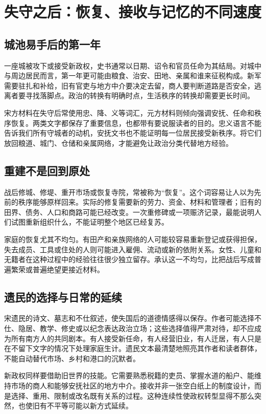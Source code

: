 \section{失守之后：恢复、接收与记忆的不同速度}

\subsection{城池易手后的第一年}

一座城被攻下或接受新政权，史书通常以日期、诏令和官员任命为其结局。对城中与周边居民而言，第一年更可能由粮食、治安、田地、亲属和谁来征税构成。新军需要驻扎和补给，旧有官吏与地方中介要决定去留，商人要判断道路是否安全，逃离者要寻找落脚点。政治的转换有明确时点，生活秩序的转换却需要更长时间。

宋方材料在失守后常使用忠、降、义等词汇，元方材料则倾向强调安抚、任命和秩序恢复。两类文字都保存了重要信息，也都带有要说服读者的目的。忠义语言不能告诉我们所有守城者的动机，安抚文书也不能证明每一位居民接受新秩序。将它们放回粮道、城门、仓储和亲属网络，才能避免让政治分类代替地方经验。

\subsection{重建不是回到原处}

战后修城、修堤、重开市场或恢复寺院，常被称为“恢复”。这个词容易让人以为先前的秩序能够原样回来。实际的修复需要新的劳力、资金、材料和管理者；旧有的田界、债务、人口和商路可能已经改变。一次重修碑或一项赈济记录，最能说明人们试图重新组织什么，不能证明整个地区已经复苏。

家庭的恢复尤其不均匀。有田产和亲族网络的人可能较容易重新登记或获得担保，失去成员、工具或住处的人则可能进入雇佣、流动或新的依附关系。女性、儿童和无籍者在这种过程中的经验往往很少独立留存。承认这一不均匀，比把战后写成普遍繁荣或普遍绝望更接近材料。

\subsection{遗民的选择与日常的延续}

宋遗民的诗文、墓志和不仕叙述，使失国后的道德情感得以保存。作者可能选择不仕、隐居、教学、修史或以纪念表达政治立场；这些选择值得严肃对待，却不应成为所有南方人的共同剧本。有人接受新任命，有人经营旧业，有人迁居，有人只是在不留下文字的情况下处理家庭生计。遗民文本最清楚地照亮其作者和读者群体，不能自动替代市场、乡村和港口的沉默者。

新政权同样要借助旧世界的技能。它需要熟悉税籍的吏员、掌握水道的船户、能维持市场的商人和能够安抚社区的地方中介。接收并非一张空白纸上的制度设计，而是选择、重用、限制或改名既有关系的过程。这种连续性使政权转型显得不那么突然，也使旧有不平等可能以新方式延续。

